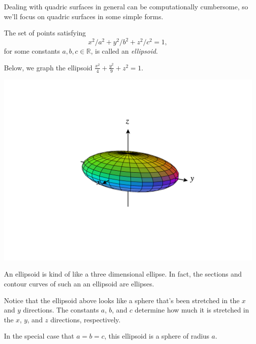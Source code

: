 \documentclass{ximera}
\begin{document}
Dealing with quadric surfaces in general can be computationally cumbersome, so we'll focus on quadric surfaces in some simple forms.

\begin{example}
The set of points satisfying
\[
x^2/a^2 + y^2/b^2 + z^2/c^2 = 1,
\]
for some constants $a,b,c\in\mathbb{R}$, is called an \emph{ellipsoid}.

Below, we graph the ellipsoid $\frac{x^2}{4} + \frac{y^2}{9} + z^2 = 1$.

\begin{image}
\includegraphics[width = \textwidth]{CalcPlot3D-ellipsoid}
\end{image}

An ellipsoid is kind of like a three dimensional ellipse. In fact, the sections and contour curves of such an an ellipsoid are ellipses.

Notice that the ellipsoid above looks like a sphere that's been stretched in the $x$ and $y$ directions. The constants $a$, $b$, and $c$ determine how much it is stretched in the $x$, $y$, and $z$ directions, respectively.

In the special case that $a=b=c$, this ellipsoid is a sphere of radius $a$.
\end{example}
\end{document}
